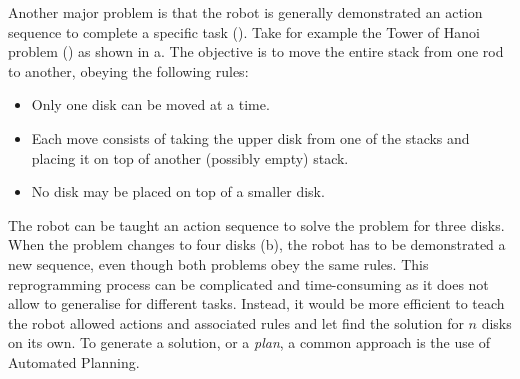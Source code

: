 Another major problem is that the robot is generally demonstrated an action sequence to complete a specific task (\cite{orendt2016robot,peppoloni2014ros}).
Take for example the Tower of Hanoi problem (\cite{douglas1985metamagical}) as shown in a.
The objective is to move the entire stack from one rod to another, obeying the following rules:
\begin{itemize}
\item Only one disk can be moved at a time.
\item Each move consists of taking the upper disk from one of the stacks and placing it on top of another (possibly empty) stack.
\item No disk may be placed on top of a smaller disk.
\end{itemize}

The robot can be taught an action sequence to solve the problem for three disks.
When the problem changes to four disks (b), the robot has to be demonstrated a new sequence, even though both problems obey the same rules.
This reprogramming process can be complicated and time-consuming as it does not allow to generalise for different tasks.
Instead, it would be more efficient to teach the robot allowed actions and associated rules and let find the solution for $n$ disks on its own.
To generate a solution, or a \textit{plan}, a common approach is the use of Automated Planning.

